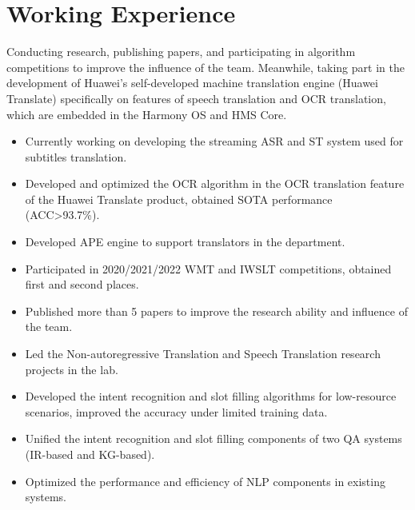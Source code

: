 \documentclass{resume_en}
\begin{document}


 

\section{Working Experience}
Conducting research, publishing papers, and participating in algorithm competitions to improve the influence of the team. Meanwhile, taking part in the development of Huawei's self-developed machine translation engine (Huawei Translate) specifically on features of speech translation and OCR translation, which are embedded in the Harmony OS and HMS Core.
\begin{itemize}
  \item Currently working on developing the streaming ASR and ST system used for subtitles translation.
  \item Developed and optimized the OCR algorithm in the OCR translation feature of the Huawei Translate product, obtained SOTA performance (ACC>93.7\%).
  \item Developed APE engine to support translators in the department.
  \item Participated in 2020/2021/2022 WMT and IWSLT competitions, obtained first and second places.
  \item Published more than 5 papers to improve the research ability and influence of the team.
  \item Led the Non-autoregressive Translation and Speech Translation research projects in the lab.
  \item Developed the intent recognition and slot filling algorithms for low-resource scenarios, improved the accuracy under limited training data.
  \item Unified the intent recognition and slot filling components of two QA systems (IR-based and KG-based).
  \item Optimized the performance and efficiency of NLP components in existing systems.
\end{itemize}
\end{document}
